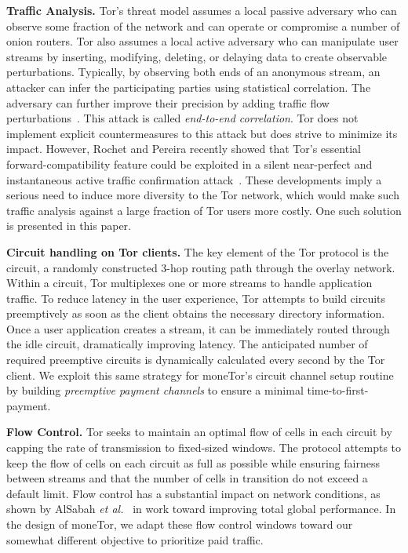 \textbf{Traffic Analysis.}
Tor's threat model assumes a local passive adversary who can observe some fraction of the network and can operate or compromise a number of onion routers.
Tor also assumes a local active adversary who can manipulate user streams by inserting, modifying, deleting, or delaying data to create observable perturbations.
Typically, by observing both ends of an anonymous stream, an attacker can infer the participating parties using statistical correlation.
The adversary can further improve their precision by adding traffic flow perturbations~\cite{fu2009one}.
This attack is called \textit{end-to-end correlation}.
Tor does not implement explicit countermeasures to this attack but does strive to minimize its impact.
However, Rochet and Pereira recently showed that Tor's essential forward-compatibility feature could be exploited in a silent near-perfect and instantaneous active traffic confirmation attack~\cite{rochet2018dropping}.
These developments imply a serious need to induce more diversity to the Tor network, which would make such traffic analysis against a large fraction of Tor users more costly.
One such solution is presented in this paper.

\medskip \noindent \textbf{Circuit handling on Tor clients.}
The key element of the Tor protocol is the circuit, a randomly constructed 3-hop routing path through the overlay network.
Within a circuit, Tor multiplexes one or more streams to handle application traffic.
To reduce latency in the user experience, Tor attempts to build circuits preemptively as soon as the client obtains the necessary directory information.
Once a user application creates a stream, it can be immediately routed through the idle circuit, dramatically improving latency.
The anticipated number of required preemptive circuits is dynamically calculated every second by the Tor client.
We exploit this same strategy for moneTor's circuit channel setup routine by building \emph{preemptive payment channels} to ensure a minimal time-to-first-payment.

\medskip \noindent\textbf{Flow Control.}
Tor seeks to maintain an optimal flow of cells in each circuit by capping the rate of transmission to fixed-sized windows.
The protocol attempts to keep the flow of cells on each circuit as full as possible while ensuring fairness between streams and that the number of cells in transition do not exceed a default limit.
Flow control has a substantial impact on network conditions, as shown by AlSabah \textit{et al.}~\cite{pets2011-defenestrator} in work toward improving total global performance.
In the design of moneTor, we adapt these flow control windows toward our somewhat different objective to prioritize paid traffic.

